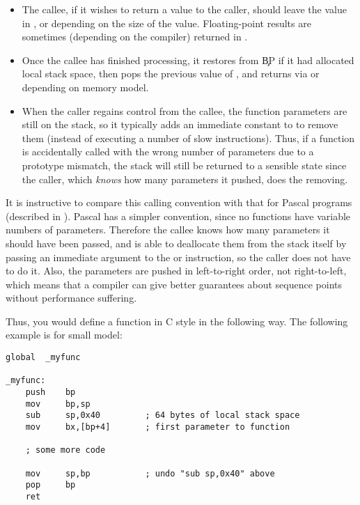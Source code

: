 \begin{itemize}
    \item{The callee, if it wishes to return a value to the caller, should
        leave the value in ,  or  depending
        on the size of the value. Floating-point results are sometimes
        (depending on the compiler) returned in .}

    \item{Once the callee has finished processing, it restores  from
        \c{BP} if it had allocated local stack space, then pops the previous
        value of , and returns via  or  depending on
        memory model.}

    \item{When the caller regains control from the callee, the function
        parameters are still on the stack, so it typically adds an immediate
        constant to  to remove them (instead of executing a number of
        slow  instructions). Thus, if a function is accidentally
        called with the wrong number of parameters due to a prototype
        mismatch, the stack will still be returned to a sensible state since
        the caller, which \emph{knows} how many parameters it pushed, does the
        removing.}
\end{itemize}

It is instructive to compare this calling convention with that for
Pascal programs (described in ). Pascal has
a simpler convention, since no functions have variable numbers of parameters.
Therefore the callee knows how many parameters it should have been
passed, and is able to deallocate them from the stack itself by
passing an immediate argument to the  or 
instruction, so the caller does not have to do it. Also, the
parameters are pushed in left-to-right order, not right-to-left,
which means that a compiler can give better guarantees about
sequence points without performance suffering.

Thus, you would define a function in C style in the following way.
The following example is for small model:

\begin{lstlisting}
global  _myfunc

_myfunc:
    push    bp
    mov     bp,sp
    sub     sp,0x40         ; 64 bytes of local stack space
    mov     bx,[bp+4]       ; first parameter to function

    ; some more code

    mov     sp,bp           ; undo "sub sp,0x40" above
    pop     bp
    ret
\end{lstlisting}

